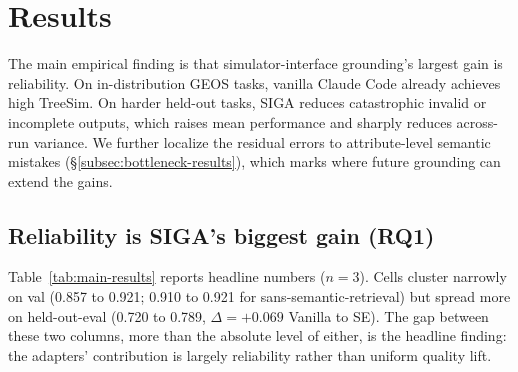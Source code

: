 \documentclass{article}
\begin{document}
\section{Results}
\label{sec:results}

The main empirical finding is that simulator-interface grounding's largest gain is reliability. On in-distribution GEOS
tasks, vanilla Claude Code already achieves high TreeSim. On harder held-out tasks, SIGA reduces catastrophic invalid or
incomplete outputs, which raises mean performance and sharply reduces across-run variance. We further localize the
residual errors to attribute-level semantic mistakes (\S\ref{subsec:bottleneck-results}), which marks where future
grounding can extend the gains.

\subsection{Reliability is SIGA's biggest gain (RQ1)}
\label{subsec:quality}

Table~\ref{tab:main-results} reports headline numbers ($n=3$). Cells cluster narrowly on val (0.857 to 0.921; 0.910 to 0.921 for sans-semantic-retrieval) but spread more on held-out-eval (0.720 to 0.789, $\Delta = +0.069$ Vanilla to SE). The gap between these two columns, more than the absolute level of either, is the headline finding: the adapters' contribution is largely reliability rather than uniform quality lift.
\end{document}
